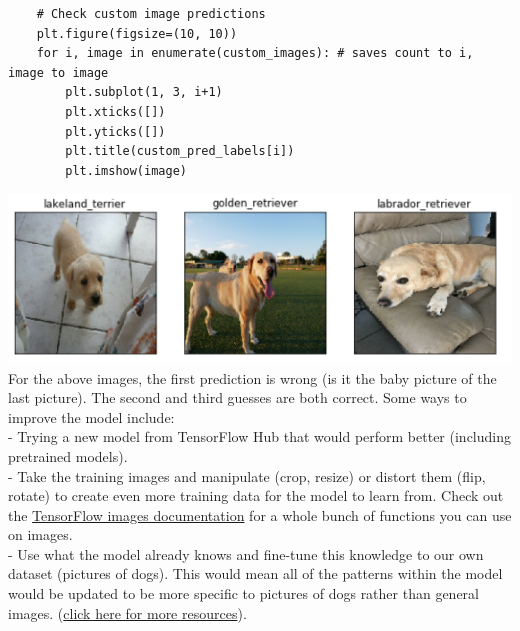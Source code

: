 \documentclass[11pt, a4paper]{article}
\begin{document}
\begin{spacing}{1.1}
\begin{lstlisting}
	# Check custom image predictions
	plt.figure(figsize=(10, 10))
	for i, image in enumerate(custom_images): # saves count to i, image to image
		plt.subplot(1, 3, i+1)
		plt.xticks([])
		plt.yticks([])
		plt.title(custom_pred_labels[i])
		plt.imshow(image)	\end{lstlisting} \vspace*{1mm} 
	\includegraphics[scale=.6]{custom_preds} \\
	For the above images, the first prediction is wrong (is it the baby picture of the last picture). The second and third guesses are both correct. Some ways to improve the model include: \\
	\hspace*{2mm} - Trying a new model from TensorFlow Hub that would perform better (including pretrained models). \\
	\hspace*{2mm} - Take the training images and manipulate (crop, resize) or distort them (flip, rotate) to create even \hspace*{5.5mm} more training data for the model to learn from. Check out the \href{https://www.tensorflow.org/api_docs/python/tf/image}{TensorFlow images documentation} \hspace*{5.5mm} for a whole bunch of functions you can use on images. \\
	\hspace*{2mm} - Use what the model already knows and fine-tune this knowledge to our own dataset (pictures of \hspace*{5.5mm} dogs). This would mean all of the patterns within the model would be updated to be more specific \hspace*{5.5mm} to pictures of dogs rather than general images. (\href{https://www.tensorflow.org/resources/learn-ml}{click here for more resources}). \newpage 

	
	
	
	
	
	
	
	
	
	
	\end{spacing}
\end{document}
